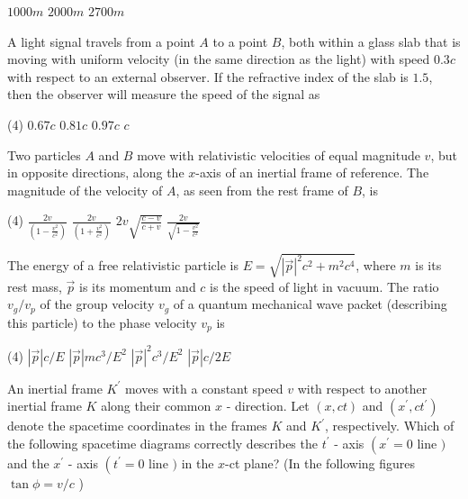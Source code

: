 \begin{enumerate}
\begin{tasks}
	\task[\textbf{B.}]$1000 m$
	\task[\textbf{C.}]$2000 m$
	\task[\textbf{D.}]$2700 m$
\end{tasks}
	\item A light signal travels from a point $A$ to a point $B$, both within a glass slab that is moving with uniform velocity (in the same direction as the light) with speed $0.3 c$ with respect to an external observer. If the refractive index of the slab is $1.5$, then the observer will measure the speed of the signal as
	{}
\begin{tasks}(4)
	\task[\textbf{A.}] $0.67 c$
	\task[\textbf{B.}]$0.81 c$
	\task[\textbf{C.}]$0.97 c$
	\task[\textbf{D.}] $c$
\end{tasks}
\begin{minipage}{\textwidth}
	\item Two particles $A$ and $B$ move with relativistic velocities of equal magnitude $v$, but in opposite directions, along the $x$-axis of an inertial frame of reference. The magnitude of the velocity of $A$, as seen from the rest frame of $B$, is
\end{minipage}
\begin{tasks}(4)
	\task[\textbf{A.}] $\frac{2 v}{\left(1-\frac{v^{2}}{c^{2}}\right)}$ 
	\task[\textbf{B.}]$\frac{2 v}{\left(1+\frac{v^{2}}{c^{2}}\right)}$
	\task[\textbf{C.}] $2 v \sqrt{\frac{c-v}{c+v}}$ 
	\task[\textbf{D.}]$\frac{2 v}{\sqrt{1-\frac{v^{2}}{c^{2}}}}$
\end{tasks}
	\item The energy of a free relativistic particle is $E=\sqrt{|\vec{p}|^{2} c^{2}+m^{2} c^{4}}$, where $m$ is its rest mass, $\vec{p}$ is its momentum and $c$ is the speed of light in vacuum. The ratio $v_{g} / v_{p}$ of the group velocity $v_{g}$ of a quantum mechanical wave packet (describing this particle) to the phase velocity $v_{p}$ is
	{}
\begin{tasks}(4)
	\task[\textbf{A.}] $|\vec{p}| c / E$
	\task[\textbf{B.}]$|\vec{p}| m c^{3} / E^{2}$
	\task[\textbf{C.}] $|\vec{p}|^{2} c^{3} / E^{2}$
	\task[\textbf{D.}]$|\vec{p}| c / 2 E$
\end{tasks}
	\item An inertial frame $K^{\prime}$ moves with a constant speed $v$ with respect to another inertial frame $K$ along their common $x$ - direction. Let $(x, c t)$ and $\left(x^{\prime}, c t^{\prime}\right)$ denote the spacetime coordinates in the frames $K$ and $K^{\prime}$, respectively. Which of the following spacetime diagrams correctly describes the $t^{\prime}$ - axis $\left(x^{\prime}=0\right.$ line $)$ and the $x^{\prime}$ - axis $\left(t^{\prime}=0\right.$ line $)$ in the $x$-ct plane? (In the following figures $\tan \phi=v / c$ )

\end{enumerate}
